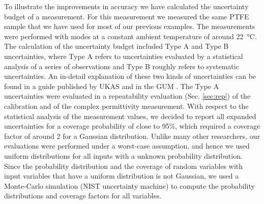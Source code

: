 To illustrate the improvements in accuracy we have calculated the uncertainty budget of a measurement. For this measurement we measured the same PTFE sample that we have used for most of our previous examples. The measurements were performed with \te{} modes at a constant ambient temperature of around \SI{22}{\celsius}. The calculation of the uncertainty budget included Type A and Type B uncertainties, where Type A refers to uncertainties evaluated by a statistical analysis of a series of observations and Type B roughly refers to systematic uncertainties. An in-detail explanation of these two kinds of uncertainties can be found in a guide published by UKAS \cite{UKAS} and in the GUM \cite{GUM}. The Type A uncertainties were evaluated in a repeatability evaluation (Sec. \ref{sec:rep}) of the calibration and of the complex permittivity measurement. With respect to the statistical analysis of the measurement values, we decided to report all expanded uncertainties for a coverage probability of close to 95\%, which required a coverage factor of around 2 for a Gaussian distribution. Unlike many other researchers, our evaluations were performed under a worst-case assumption, and hence we used uniform distributions for all inputs with a unknown probability distribution. Since the probability distribution and the coverage of random variables with input variables that have a uniform distribution is not Gaussian, we used a Monte-Carlo simulation (NIST uncertainty machine) to compute the probability distributions and coverage factors for all variables.

